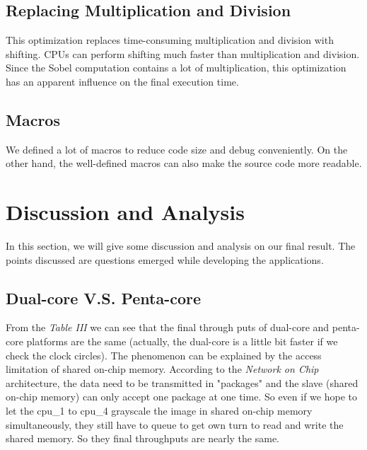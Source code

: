 \documentclass[conference]{IEEEtran}
\begin{document}
\subsection{Replacing Multiplication and Division}
This optimization replaces time-consuming multiplication and division with shifting. CPUs can perform shifting much faster than multiplication and division. Since the Sobel computation contains a lot of multiplication, this optimization has an apparent influence on the final execution time.
\subsection{Macros}
We defined a lot of macros to reduce code size and debug conveniently. On the other hand, the well-defined macros can also make the source code more readable.
\section{Discussion and Analysis}
In this section, we will give some discussion and analysis on our final result. The points discussed are questions emerged while developing the applications.
\subsection{Dual-core V.S. Penta-core}
From the \emph{Table III} we can see that the final through puts of dual-core and penta-core platforms are the same (actually, the dual-core is a little bit faster if we check the clock circles). The phenomenon can be explained by the access limitation of shared on-chip memory. According to the \emph{Network on Chip} architecture, the data need to be transmitted in "packages" and the slave (shared on-chip memory) can only accept one package at one time\cite{NoC}. So even if we hope to let the cpu\_1 to cpu\_4 grayscale the image in shared on-chip memory simultaneously, they still have to queue to get own turn to read and write the shared memory. So they final throughputs are nearly the same.
\end{document}

